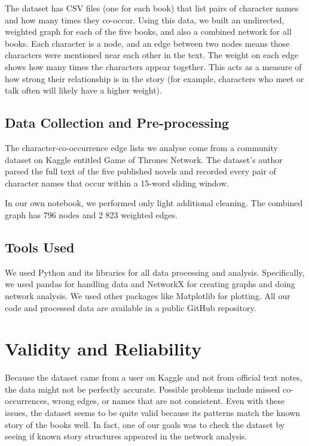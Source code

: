 \documentclass[12pt, a4paper]{article}
\begin{document}
The dataset has CSV files (one for each book) that list pairs of character names and how many times they co-occur. Using this data, we built an undirected, weighted graph for each of the five books, and also a combined network for all books. Each character is a node, and an edge between two nodes means those characters were mentioned near each other in the text. The weight on each edge shows how many times the characters appear together. This acts as a measure of how strong their relationship is in the story (for example, characters who meet or talk often will likely have a higher weight).


\subsection*{Data Collection and Pre-processing}

The character-co-occurrence edge lists we analyse come from a community dataset on Kaggle entitled Game of Thrones Network.
The dataset's author parsed the full text of the five published novels and recorded every pair of character names that occur within a 15-word sliding window.

In our own notebook, we performed only light additional cleaning. 
The combined graph has 796 nodes and 2 823 weighted edges.

\subsection*{Tools Used}
We used Python and its libraries for all data processing and analysis. Specifically, we used pandas for handling data and NetworkX for creating graphs and doing network analysis. We used other packages like Matplotlib for plotting.  All our code and processed data are available in a public GitHub repository.
\section{Validity and Reliability}

\label{validity-and-reliability}
Because the dataset came from a user on Kaggle and not from official text notes, the data might not be perfectly accurate. Possible problems include missed co-occurrences, wrong edges, or names that are not consistent. Even with these issues, the dataset seems to be quite valid because its patterns match the known story of the books well. In fact, one of our goals was to check the dataset by seeing if known story structures appeared in the network analysis. 
\end{document}
